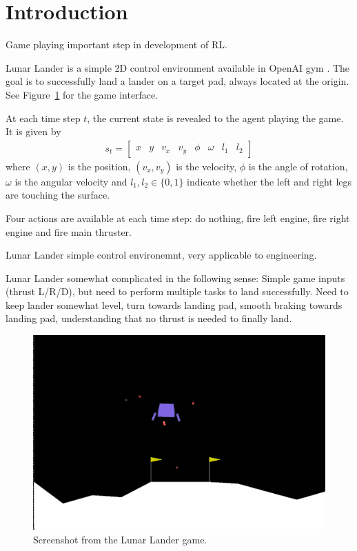 \documentclass{article}
\begin{document}
\section{Introduction}
\label{introduction}

Game playing important step in development of RL.

Lunar Lander is a simple 2D control environment available in OpenAI gym \cite{gym}. The goal is to successfully land a lander on a target pad, always located at the origin. See Figure~\ref{fig:screenshot} for the game interface.

At each time step $t$, the current state is revealed to the agent playing the game. It is given by
\begin{align}
  s_t = \begin{bmatrix} x & y & v_x & v_y & \phi & \omega & l_1 & l_ 2 \end{bmatrix}
\end{align}
where $(x,y)$ is the position, $(v_x, v_y)$ is the velocity, $\phi$ is the angle of rotation, $\omega$ is the angular velocity and $l_1, l_2 \in \{ 0,1 \}$ indicate whether the left and right legs are touching the surface.

Four actions are available at each time step: do nothing, fire left engine, fire right engine and fire main thruster.

Lunar Lander simple control environemnt, very applicable to engineering.

Lunar Lander somewhat complicated in the following sense: Simple game inputs (thrust L/R/D), but need to perform multiple tasks to land successfully. Need to keep lander somewhat level, turn towards landing pad, smooth braking towards landing pad, understanding that no thrust is needed to finally land.

\begin{figure}
  \includegraphics[width=\linewidth]{images/screenshot.png}
  \caption{Screenshot from the Lunar Lander game.}
  \label{fig:screenshot}
\end{figure}
\end{document}
